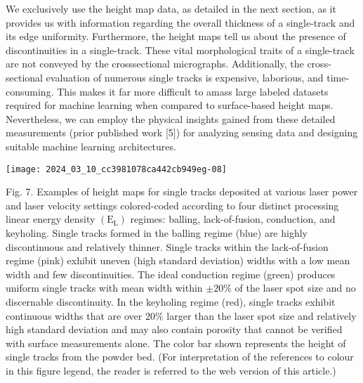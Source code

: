\documentclass[10pt]{article}
\begin{document}
We exclusively use the height map data, as detailed in the next section, as it provides us with information regarding the overall thickness of a single-track and its edge uniformity. Furthermore, the height maps tell us about the presence of discontinuities in a single-track. These vital morphological traits of a single-track are not conveyed by the crosssectional micrographs. Additionally, the cross-sectional evaluation of numerous single tracks is expensive, laborious, and time-consuming. This makes it far more difficult to amass large labeled datasets required for machine learning when compared to surface-based height maps. Nevertheless, we can employ the physical insights gained from these detailed measurements (prior published work [5]) for analyzing sensing data and designing suitable machine learning architectures.

\begin{center}
\texttt{[image: 2024\_03\_10\_cc3981078ca442cb949eg-08]}
\end{center}

Fig. 7. Examples of height maps for single tracks deposited at various laser power and laser velocity settings colored-coded according to four distinct processing linear energy density $\left(\mathrm{E}_{\mathrm{L}}\right)$ regimes: balling, lack-of-fusion, conduction, and keyholing. Single tracks formed in the balling regime (blue) are highly discontinuous and relatively thinner. Single tracks within the lack-of-fusion regime (pink) exhibit uneven (high standard deviation) widths with a low mean width and few discontinuities. The ideal conduction regime (green) produces uniform single tracks with mean width within $\pm 20 \%$ of the laser spot size and no discernable discontinuity. In the keyholing regime (red), single tracks exhibit continuous widths that are over $20 \%$ larger than the laser spot size and relatively high standard deviation and may also contain porosity that cannot be verified with surface measurements alone. The color bar shown represents the height of single tracks from the powder bed. (For interpretation of the references to colour in this figure legend, the reader is referred to the web version of this article.)
\end{document}

